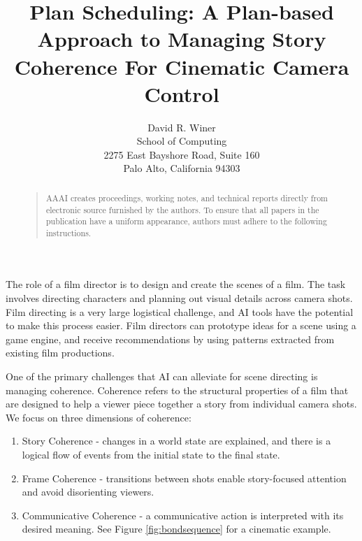 \documentclass[letterpaper]{article}
\begin{document}
%
\title{Plan Scheduling: A Plan-based Approach to Managing Story Coherence \break For Cinematic Camera Control}
\author{David R. Winer\\
School of Computing\\
2275 East Bayshore Road, Suite 160\\
Palo Alto, California 94303\\
}
\maketitle
\begin{abstract}
\begin{quote}
AAAI creates proceedings, working notes, and technical reports directly from electronic source furnished by the authors. To ensure that all papers in the publication have a uniform appearance, authors must adhere to the following instructions. 
\end{quote}
\end{abstract}

\noindent
The role of a film director is to design and create the scenes of a film. The task involves directing characters and planning out visual details across camera shots. Film directing is a very large logistical challenge, and AI tools have the potential to make this process easier. Film directors can prototype ideas for a scene using a game engine, and receive recommendations by using patterns extracted from existing film productions. 

One of the primary challenges that AI can alleviate for scene directing is managing coherence. Coherence refers to the structural properties of a film that are designed to help a viewer piece together a story from individual camera shots. We focus on three dimensions of coherence:
\begin{enumerate}
    \item Story Coherence - changes in a world state are explained, and there is a logical flow of events from the initial state to the final state.
    \item Frame Coherence - transitions between shots enable story-focused attention and avoid disorienting viewers.
    \item Communicative Coherence - a communicative action is interpreted with its desired meaning. See Figure \ref{fig:bondsequence} for a cinematic example.
\end{enumerate}
\end{document}
